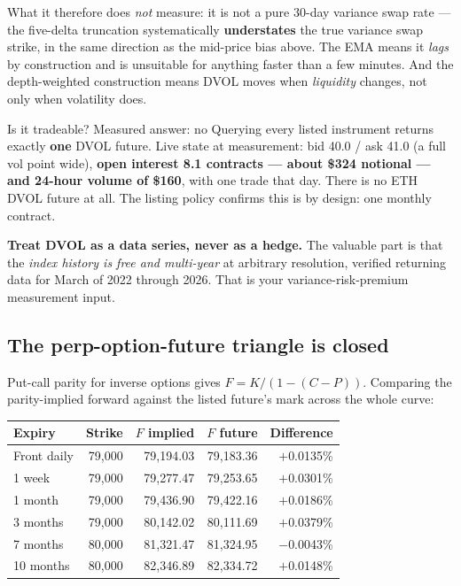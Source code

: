 \documentclass[11pt,a4paper]{article}
\begin{document}
What it therefore does \emph{not} measure: it is not a pure 30-day variance swap
rate --- the five-delta truncation systematically \textbf{understates} the true
variance swap strike, in the same direction as the mid-price bias above. The EMA
means it \emph{lags} by construction and is unsuitable for anything faster than a
few minutes. And the depth-weighted construction means DVOL moves when
\emph{liquidity} changes, not only when volatility does.

\begin{keyfact}{Is it tradeable? Measured answer: no}
Querying every listed instrument returns exactly \textbf{one} DVOL future. Live
state at measurement: bid 40.0 / ask 41.0 (a full vol point wide), \textbf{open
interest 8.1 contracts --- about \$324 notional --- and 24-hour volume of \$160},
with one trade that day. There is no ETH DVOL future at all. The listing policy
confirms this is by design: one monthly contract.

\textbf{Treat DVOL as a data series, never as a hedge.} The valuable part is that
the \emph{index history is free and multi-year} at arbitrary resolution, verified
returning data for March of 2022 through 2026. That is your variance-risk-premium
measurement input.
\end{keyfact}

\subsection{The perp-option-future triangle is closed}

Put-call parity for inverse options gives $F = K/(1 - (C-P))$. Comparing the
parity-implied forward against the listed future's mark across the whole curve:

\begin{center}
\begin{tabular}{@{}lrrrr@{}}
\toprule
Expiry & Strike & $F$ implied & $F$ future & Difference \\
\midrule
Front daily & 79{,}000 & 79{,}194.03 & 79{,}183.36 & $+$0.0135\% \\
1 week      & 79{,}000 & 79{,}277.47 & 79{,}253.65 & $+$0.0301\% \\
1 month     & 79{,}000 & 79{,}436.90 & 79{,}422.16 & $+$0.0186\% \\
3 months    & 79{,}000 & 80{,}142.02 & 80{,}111.69 & $+$0.0379\% \\
7 months    & 80{,}000 & 81{,}321.47 & 81{,}324.95 & $-$0.0043\% \\
10 months   & 80{,}000 & 82{,}346.89 & 82{,}334.72 & $+$0.0148\% \\
\bottomrule
\end{tabular}
\end{center}
\end{document}
